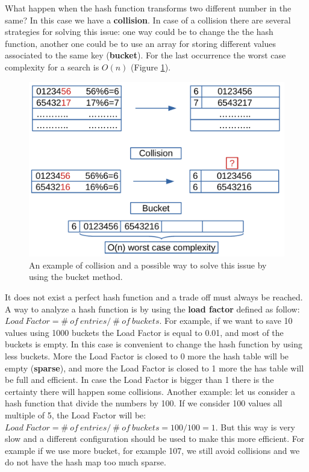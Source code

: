 What happen when the hash function transforms two different number in the same? In this case we have a \textbf{collision}. In case of a collision there are several strategies for solving this issue: one way could be to change the the hash function, another one could be to use an array for storing different values associated to the same key (\textbf{bucket}). For the last occurrence the worst case complexity for a search is \(O(n)\) (Figure \ref{map_2}).

\begin{figure}[H]
	\begin{center}
		\includegraphics[scale=.6]{chapters/datastructures/images/map_2.pdf}
		\caption[An example of collision and a possible way to solve this issue by using the bucket method.]{An example of collision and a possible way to solve this issue by using the bucket method.}
		\label{map_2}
	\end{center}
\end{figure}

It does not exist a perfect hash function and a trade off must always be reached. A way to analyze a hash function is by using the \textbf{load factor} defined as follow: \(Load \ Factor = \# \ of \ entries / \ \# \ of \ buckets\). For example, if we want to save 10 values using 1000 buckets the Load Factor is equal to 0.01, and most of the buckets is empty. In this case is convenient to change the hash function by using less buckets. More the Load Factor is closed to 0 more the hash table will be empty (\textbf{sparse}), and more the Load Factor is closed to 1 more the has table will be full and efficient. In case the Load Factor is bigger than 1 there is the certainty there will happen some collisions.
Another example: let us consider a hash function that divide the numbers by 100. If we consider 100 values all multiple of 5, the Load Factor will be: \(Load \ Factor = \# \ of \ entries / \ \# \ of \ buckets = 100/100 = 1\). But this way is very slow and a different configuration should be used to make this more efficient. For example if we use more bucket, for example 107, we still avoid collisions and we do not have the hash map too much sparse.

